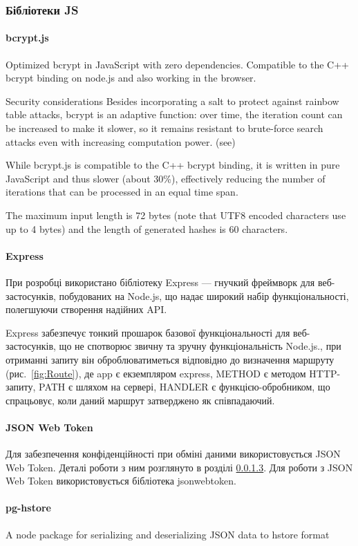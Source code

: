 \subsubsection{Бібліотеки JS}

\paragraph{bcrypt.js}

Optimized bcrypt in JavaScript with zero dependencies. Compatible to the C++ bcrypt binding on node.js and also working in the browser.

Security considerations
Besides incorporating a salt to protect against rainbow table attacks, bcrypt is an adaptive function: over time, the iteration count can be increased to make it slower, so it remains resistant to brute-force search attacks even with increasing computation power. (see)

While bcrypt.js is compatible to the C++ bcrypt binding, it is written in pure JavaScript and thus slower (about 30\%), effectively reducing the number of iterations that can be processed in an equal time span.

The maximum input length is 72 bytes (note that UTF8 encoded characters use up to 4 bytes) and the length of generated hashes is 60 characters.

\paragraph{Express}

При розробці використано бібліотеку Express — гнучкий фреймворк для веб-застосунків, побудованих на Node.js, що надає широкий набір функціональності, полегшуючи створення надійних API.

Express забезпечує тонкий прошарок базової функціональності для веб-застосунків, що не спотворює звичну та зручну функціональність Node.js., при отриманні запиту він оброблюватиметься відповідно до визначення маршруту (рис.~\ref{fig:Route}), де app є екземпляром express, METHOD є методом HTTP-запиту, PATH є шляхом на сервері, HANDLER є функцією-обробником, що спрацьовує, коли даний маршрут затверджено як співпадаючий.

\paragraph{JSON Web Token} \label{subsubsection:jwt}

Для забезпечення конфіденційності при обміні даними використовується JSON Web Token. Деталі роботи з ним розглянуто в розділі \ref{subsubsection:jwt}. Для роботи з JSON Web Token використовується бібліотека jsonwebtoken.

\paragraph{pg-hstore}

A node package for serializing and deserializing JSON data to hstore format

